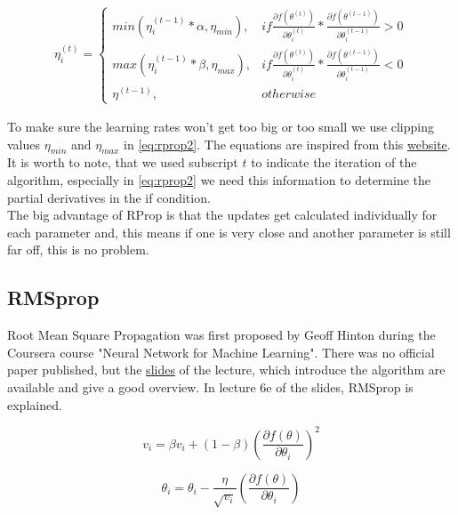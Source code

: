\documentclass[aodsor,preprint]{imsart}
\numberwithin{equation}{section}
\theoremstyle{plain}
\begin{document}
\begin{align} \label{eq:rprop2}
\eta_{i}^{(t)} = \left\{ 
	\begin{array}{ll}
		min(\eta_{i}^{(t-1)}*\alpha, \eta_{min}),& if \frac{\partial f(\theta^{(t)})}{\partial \theta_{i}^{(t)}} * \frac{\partial f(\theta^{(t-1)})}{\partial \theta_{i}^{(t-1)}} > 0\\
		max(\eta_{i}^{(t-1)}*\beta, \eta_{max}), & if \frac{\partial f(\theta^{(t)})}{\partial \theta_{i}^{(t)}} * \frac{\partial f(\theta^{(t-1)})}{\partial \theta_{i}^{(t-1)}} < 0\\
		\eta^{(t-1)}, & otherwise
	\end{array}		
\right.
\end{align}

To make sure the learning rates won't get too big or too small we use clipping values $\eta_{min}$ and $\eta_{max}$ in \ref{eq:rprop2}. The equations are inspired from this \href{https://florian.github.io/rprop/}{website}. It is worth to note, that we used subscript $t$ to indicate the iteration of the algorithm, especially in \ref{eq:rprop2} we need this information to determine the partial derivatives in the if condition. \\
The big advantage of RProp is that the updates get calculated individually for each parameter and, this means if one is very close and another parameter is still far off, this is no problem. 

\subsection{RMSprop}
Root Mean Square Propagation was first proposed by Geoff Hinton during the Coursera course "Neural Network for Machine Learning". There was no official paper published, but the \href{https://www.cs.toronto.edu/~tijmen/csc321/slides/lecture_slides_lec6.pdf}{slides} of the lecture, which introduce the algorithm are available and give a good overview. In lecture 6e of the slides, RMSprop is explained.

\begin{equation} \label{eq:rmsprop1}
v_{i} = \beta v_{i} + (1-\beta) \left(\frac{\partial f(\theta)}{\partial \theta_{i}}\right)^2
\end{equation}

\begin{equation} \label{eq:rmsprop2}
\theta_{i} = \theta_{i} - \frac{\eta}{\sqrt{v_{i}}} \left(\frac{\partial f(\theta)}{\partial \theta_{i}} \right)
\end{equation}
\end{document}

